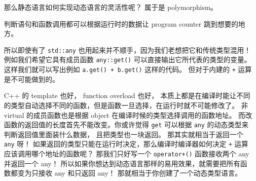 那么静态语言如何实现动态语言的灵活性呢？ 属于是 polymorphism。

判断语句和函数调用都可以根据运行时的数据让 program counter 跳到想要的地方。

所以即使有了 \verb`std::any` 也用起来并不顺手，因为我们老想把它和传统类型混用！例如我们希望它具有成员函数 \verb`any::get()` 可以直接输出它所代表的类型的变量。 这样我们就可以写出例如 \verb`a.get() + b.get()` 这样的代码。 但对于内建的 \verb`+` 运算是不可能做到的。

C++ 的 template 也好， function overload 也好， 本质上都是在编译时能让不同的类型自动选择不同的函数，但是函数一旦选择，在运行时就不可能修改了。 非 virtual 的成员函数也是根据 object 在编译时候的类型选择调用的函数地址。 而改函数的返回值的长度首先不能改变。你或许觉得 \verb`get` 可以根据 \verb`any` 的动态类型来判断返回值里面装什么数据， 且把类型也一块返回。 那其实就相当于返回一个 \verb`any` 呀！ 如果返回的类型只能在运行时决定，那么编译时编译器如何决定 \verb`+` 运算应该调用哪个地址的函数呢？ 那我们只好写一个 \verb`operator+()` 函数接收两个 any 并返回一个 any！ 所以如果你想达到动态语言那样的易用效果，就需要把所有函数都变为只接收 any 和只返回 any！ 那就相当于你创建了一个动态类型语言。
